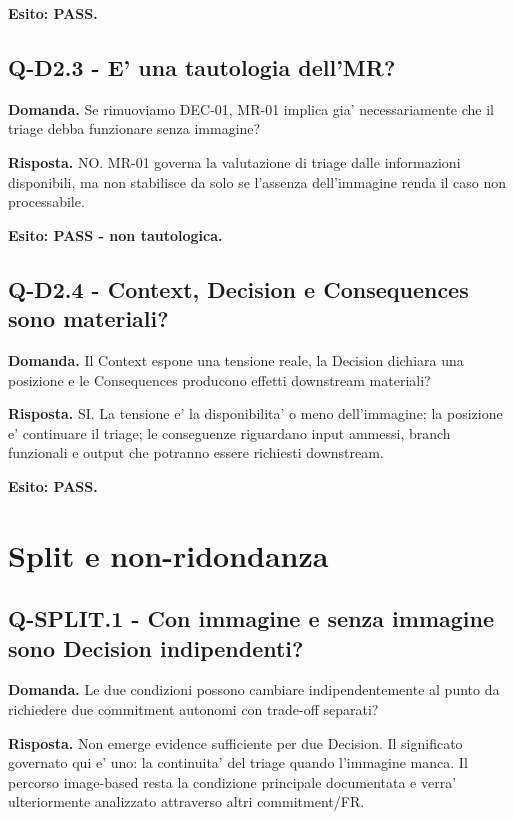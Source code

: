 \documentclass[11pt,a4paper]{article}
\begin{document}
\textbf{Esito: PASS.}

\subsection{Q-D2.3 - E' una tautologia dell'MR?}
\begin{ddtacheck}
\textbf{Domanda.} Se rimuoviamo DEC-01, MR-01 implica gia' necessariamente che il triage debba funzionare senza immagine?
\end{ddtacheck}

\textbf{Risposta.} NO. MR-01 governa la valutazione di triage dalle informazioni disponibili, ma non stabilisce da solo se l'assenza dell'immagine renda il caso non processabile.

\textbf{Esito: PASS - non tautologica.}

\subsection{Q-D2.4 - Context, Decision e Consequences sono materiali?}
\begin{ddtacheck}
\textbf{Domanda.} Il Context espone una tensione reale, la Decision dichiara una posizione e le Consequences producono effetti downstream materiali?
\end{ddtacheck}

\textbf{Risposta.} SI. La tensione e' la disponibilita' o meno dell'immagine; la posizione e' continuare il triage; le conseguenze riguardano input ammessi, branch funzionali e output che potranno essere richiesti downstream.

\textbf{Esito: PASS.}

\section{Split e non-ridondanza}

\subsection{Q-SPLIT.1 - Con immagine e senza immagine sono Decision indipendenti?}
\begin{ddtacheck}
\textbf{Domanda.} Le due condizioni possono cambiare indipendentemente al punto da richiedere due commitment autonomi con trade-off separati?
\end{ddtacheck}

\textbf{Risposta.} Non emerge evidence sufficiente per due Decision. Il significato governato qui e' uno: la continuita' del triage quando l'immagine manca. Il percorso image-based resta la condizione principale documentata e verra' ulteriormente analizzato attraverso altri commitment/FR.
\end{document}
